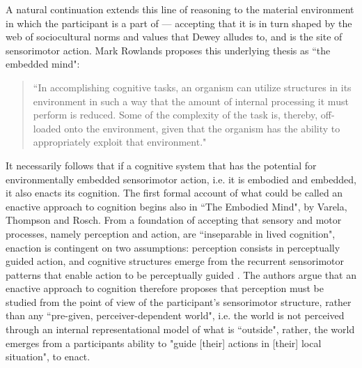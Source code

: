 A natural continuation extends this line of reasoning to the material environment in which the participant is a part of — accepting that it is in turn shaped by the web of sociocultural norms and values that Dewey alludes to, and is the site of sensorimotor action. Mark Rowlands proposes this underlying thesis as ``the embedded mind":
\begin{quote}
    ``In accomplishing cognitive tasks, an organism can utilize structures in its environment in such a way that the amount of internal processing it must perform is reduced. Some of the complexity of the task is, thereby, off-loaded onto the environment, given that the organism has the ability to appropriately exploit that environment." \citeyearpar[p. 68]{rowlands2010}  
\end{quote}
It necessarily follows that if a cognitive system that has the potential for environmentally embedded sensorimotor action, i.e. it is embodied and embedded, it also enacts its cognition. The first formal account of what could be called an enactive approach to cognition begins also in ``The Embodied Mind", by Varela, Thompson and Rosch. From a foundation of accepting that sensory and motor processes, namely perception and action, are ``inseparable in lived cognition", enaction is contingent on two assumptions: perception consists in perceptually guided action, and cognitive structures emerge from the recurrent sensorimotor patterns that enable action to be perceptually guided \citeyearpar[p. 173]{varela1993}. The authors argue that an enactive approach to cognition therefore proposes that perception must be studied from the point of view of the participant's sensorimotor structure, rather than any ``pre-given, perceiver-dependent world", i.e. the world is not perceived through an internal representational model of what is ``outside", rather, the world emerges from a participants ability to "guide [their] actions in [their] local situation", to enact.

